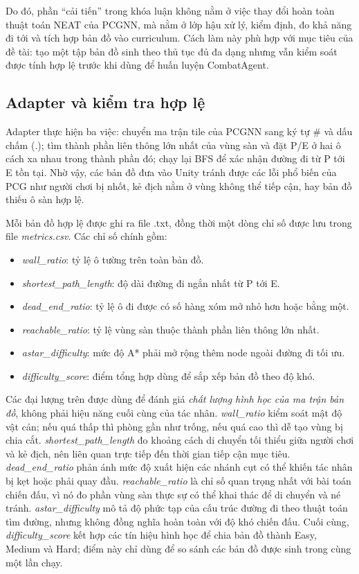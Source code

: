 Do đó, phần ``cải tiến'' trong khóa luận không nằm ở việc thay đổi hoàn toàn thuật toán NEAT của PCGNN, mà nằm ở lớp hậu xử lý, kiểm định, đo khả năng đi tới và tích hợp bản đồ vào curriculum. Cách làm này phù hợp với mục tiêu của đề tài: tạo một tập bản đồ sinh theo thủ tục đủ đa dạng nhưng vẫn kiểm soát được tính hợp lệ trước khi dùng để huấn luyện CombatAgent.

\subsection{Adapter và kiểm tra hợp lệ}

Adapter thực hiện ba việc: chuyển ma trận tile của PCGNN sang ký tự \# và dấu chấm (.); tìm thành phần liên thông lớn nhất của vùng sàn và đặt P/E ở hai ô cách xa nhau trong thành phần đó; chạy lại BFS để xác nhận đường đi từ P tới E tồn tại. Nhờ vậy, các bản đồ đưa vào Unity tránh được các lỗi phổ biến của PCG như người chơi bị nhốt, kẻ địch nằm ở vùng không thể tiếp cận, hay bản đồ thiếu ô sàn hợp lệ.

Mỗi bản đồ hợp lệ được ghi ra file .txt, đồng thời một dòng chỉ số được lưu trong file \emph{metrics.csv}. Các chỉ số chính gồm:

\begin{itemize}
    \item \emph{wall\_ratio}: tỷ lệ ô tường trên toàn bản đồ.
    \item \emph{shortest\_path\_length}: độ dài đường đi ngắn nhất từ P tới E.
    \item \emph{dead\_end\_ratio}: tỷ lệ ô đi được có số hàng xóm mở nhỏ hơn hoặc bằng một.
    \item \emph{reachable\_ratio}: tỷ lệ vùng sàn thuộc thành phần liên thông lớn nhất.
    \item \emph{astar\_difficulty}: mức độ A* phải mở rộng thêm node ngoài đường đi tối ưu.
    \item \emph{difficulty\_score}: điểm tổng hợp dùng để sắp xếp bản đồ theo độ khó.
\end{itemize}

Các đại lượng trên được dùng để đánh giá \emph{chất lượng hình học của ma trận bản đồ}, không phải hiệu năng cuối cùng của tác nhân. \emph{wall\_ratio} kiểm soát mật độ vật cản; nếu quá thấp thì phòng gần như trống, nếu quá cao thì dễ tạo vùng bị chia cắt. \emph{shortest\_path\_length} đo khoảng cách di chuyển tối thiểu giữa người chơi và kẻ địch, nên liên quan trực tiếp đến thời gian tiếp cận mục tiêu. \emph{dead\_end\_ratio} phản ánh mức độ xuất hiện các nhánh cụt có thể khiến tác nhân bị kẹt hoặc phải quay đầu. \emph{reachable\_ratio} là chỉ số quan trọng nhất với bài toán chiến đấu, vì nó đo phần vùng sàn thực sự có thể khai thác để di chuyển và né tránh. \emph{astar\_difficulty} mô tả độ phức tạp của cấu trúc đường đi theo thuật toán tìm đường, nhưng không đồng nghĩa hoàn toàn với độ khó chiến đấu. Cuối cùng, \emph{difficulty\_score} kết hợp các tín hiệu hình học để chia bản đồ thành Easy, Medium và Hard; điểm này chỉ dùng để so sánh các bản đồ được sinh trong cùng một lần chạy.

